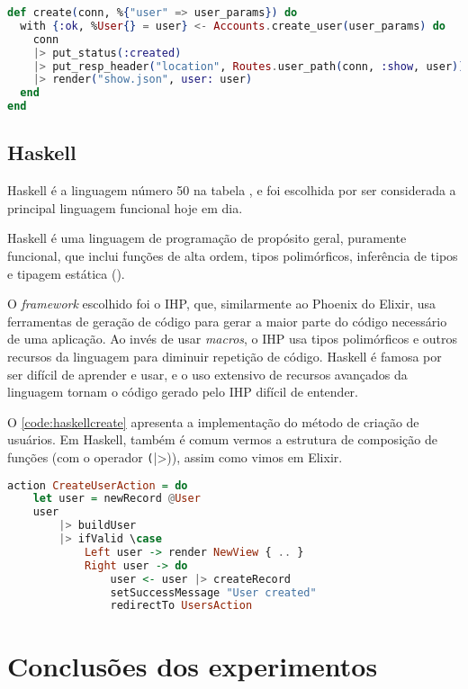 \begin{lstlisting}[language=Elixir,label={code:elixircreate},caption={Função de criação de usuário em Elixir com Phoenix}]
def create(conn, %{"user" => user_params}) do
  with {:ok, %User{} = user} <- Accounts.create_user(user_params) do
    conn
    |> put_status(:created)
    |> put_resp_header("location", Routes.user_path(conn, :show, user))
    |> render("show.json", user: user)
  end
end
\end{lstlisting}

\subsection{Haskell}\label{subsec:haskell}

Haskell é a linguagem número 50 na tabela \textcite{tiobeindex}, e foi escolhida
por ser considerada a principal linguagem funcional hoje em dia.

Haskell é uma linguagem de programação de propósito geral, puramente funcional,
que inclui funções de alta ordem, tipos polimórficos, inferência de tipos e
tipagem estática (\textcite{conceptionoffunctionalpl}).

O \textit{framework} escolhido foi o IHP, que, similarmente ao Phoenix do Elixir,
usa ferramentas de geração de código para gerar a maior parte do código necessário
de uma aplicação. Ao invés de usar \textit{macros}, o IHP usa tipos polimórficos
e outros recursos da linguagem para diminuir repetição de código. Haskell é
famosa por ser difícil de aprender e usar, e o uso extensivo de recursos avançados
da linguagem tornam o código gerado pelo IHP difícil de entender.

O \autoref{code:haskellcreate} apresenta a implementação do método de criação de
usuários. Em Haskell, também é comum vermos a estrutura de composição de funções
(com o operador \texttt(|>)), assim como vimos em Elixir.

\begin{lstlisting}[language=Haskell,label={code:haskellcreate},caption={Função de criação de usuário em Haskell com IHP}]
action CreateUserAction = do
    let user = newRecord @User
    user
        |> buildUser
        |> ifValid \case
            Left user -> render NewView { .. } 
            Right user -> do
                user <- user |> createRecord
                setSuccessMessage "User created"
                redirectTo UsersAction
\end{lstlisting}

\section{Conclusões dos experimentos}

